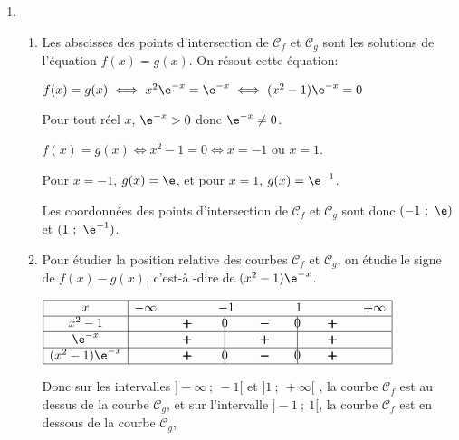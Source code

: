\begin{enumerate}
\item 
	\begin{enumerate}
		\item Les abscisses des points d'intersection de $\mathcal{C}_f$ et $\mathcal{C}_g$ sont les solutions de l'équation $f(x)=g(x)$. On résout cette équation:
		
$f(x)=g(x) \iff x^2\e^{-x}=\e^{-x}\iff (x^2-1)\e^{-x}=0$

Pour tout réel $x$, $\e^{-x}>0$ donc $\e^{-x}\neq 0$.

$f(x)=g(x) \iff x^2-1=0 \iff x=-1 \text{ ou } x=1$.

Pour $x=-1$, $g(x)=\e$, et pour $x=1$, $g(x)=\e^{-1}$.

Les coordonnées des points d'intersection de $\mathcal{C}_f$ et $\mathcal{C}_g$ sont donc $(-1~;~\e)$ et $(1~;~\e^{-1})$.
		
		\item Pour étudier la position relative des courbes $\mathcal{C}_f$ et $\mathcal{C}_g$, on étudie le signe de $f(x)-g(x)$, c'est-à -dire de $(x^2-1)\e^{-x}$.
		
\begin{center}
{
\renewcommand{\arraystretch}{1.5}
\def\esp{\hspace*{1cm}}
$\begin{array}{|c | *7{c} |} 
\hline
x  & -\infty & \esp & -1 & \esp & 1 & \esp & +\infty \\
\hline
x^2-1 &  & \pmb{+} &  \vline\hspace{-2.7pt}{0} & \pmb{-} & \vline\hspace{-2.7pt}{0} & \pmb{+} &\\
\hline
\e^{-x} &  & \pmb{+} &  \vline\hspace{-2.7pt}{\phantom 0} & \pmb{+} & \vline\hspace{-2.7pt}{\phantom 0} & \pmb{+} &\\
\hline
(x^2-1)\e^{-x} &  & \pmb{+} &  \vline\hspace{-2.7pt}{0} & \pmb{-} & \vline\hspace{-2.7pt}{0} & \pmb{+} &\\
\hline
\end{array}$
}
\end{center}		

Donc sur les intervalles $]-\infty~;~-1[$ et $]1~;~+\infty[$	, la courbe $\mathcal{C}_f$ est au dessus de la courbe $\mathcal{C}_g$,  et sur l'intervalle $]-1~;~1[$,	 la courbe $\mathcal{C}_f$ est en dessous de la courbe $\mathcal{C}_g$, 
		

\end{enumerate}
\end{enumerate}
